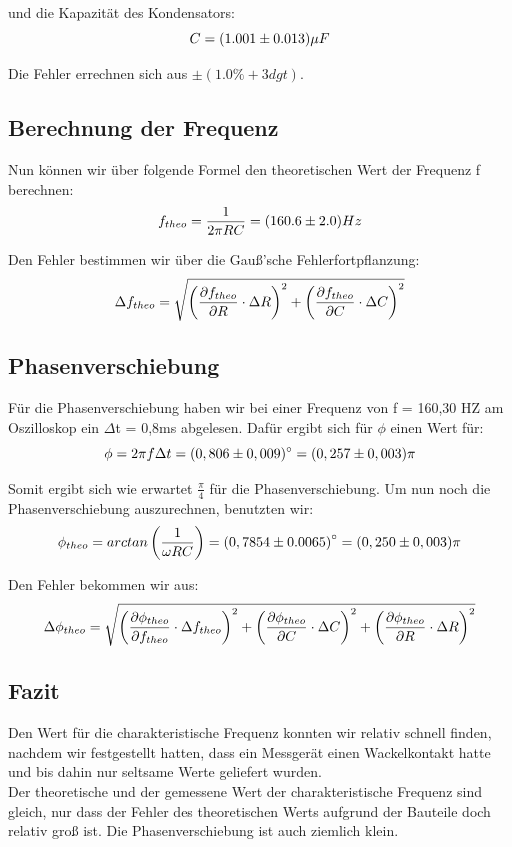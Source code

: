 und die Kapazität des Kondensators:
\begin{equation}\notag
C = (1.001 \pm 0.013)\mu F
\end{equation}

Die Fehler errechnen sich aus $\pm (1.0\% +3dgt)$.

\subsection{Berechnung der Frequenz}
Nun können wir über folgende Formel den theoretischen Wert der Frequenz f berechnen:
\begin{equation}\notag
f_{theo}=\frac{1}{2\pi RC}= (160.6 \pm 2.0)Hz
\end{equation}

Den Fehler bestimmen wir über die Gauß'sche Fehlerfortpflanzung:
\begin{equation}\notag
\Delta f_{theo}=\sqrt{\left(\frac{\partial f_{theo}}{\partial R}\cdot \Delta R\right)^2+\left(\frac{\partial f_{theo}}{\partial C}\cdot \Delta C\right)^2}
\end{equation}

\subsection{Phasenverschiebung}
Für die Phasenverschiebung haben wir bei einer Frequenz von f = 160,30 HZ am Oszilloskop ein \(\Delta\)t = 0,8ms abgelesen. Dafür ergibt sich für \(\phi\) einen Wert für:
\begin{equation}
\notag
\phi = 2\pi f \Delta t = (0,806 \pm 0,009)^\circ = (0,257\pm 0,003)\pi
\end{equation}

Somit ergibt sich wie erwartet \(\frac{\pi}{4}\) für die Phasenverschiebung.
Um nun noch die Phasenverschiebung auszurechnen, benutzten wir:
\begin{equation}\notag
\phi_{theo}=arctan\left(\frac{1}{\omega RC}\right)=\left(0,7854 \pm 0.0065\right)^\circ =(0,250\pm 0,003)\pi
\end{equation}

Den Fehler bekommen wir aus:
\begin{equation}\notag
\Delta \phi_{theo}=\sqrt{\left(\frac{\partial \phi_{theo}}{\partial f_{theo}}\cdot \Delta f_{theo}\right)^2+\left(\frac{\partial \phi_{theo}}{\partial C}\cdot \Delta C\right)^2+\left(\frac{\partial \phi_{theo}}{\partial R}\cdot \Delta R\right)^2}
\end{equation}

\subsection*{Fazit}
Den Wert für die charakteristische Frequenz konnten wir relativ schnell finden, nachdem wir festgestellt hatten, dass ein Messgerät einen Wackelkontakt hatte und bis dahin nur seltsame Werte geliefert wurden.\\
Der theoretische und der gemessene Wert der charakteristische Frequenz sind gleich, nur dass der Fehler des theoretischen Werts aufgrund der Bauteile doch relativ groß ist. Die Phasenverschiebung ist auch ziemlich klein.